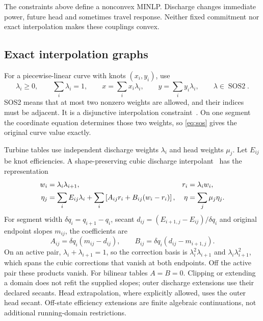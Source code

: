 \documentclass[10pt,a4paper]{article}
\newcommand{\SOS}{\operatorname{SOS2}}
\begin{document}
The constraints above define a nonconvex MINLP. Discharge changes immediate
power, future head and sometimes travel response. Neither fixed commitment
nor exact interpolation makes these couplings convex.

\subsection{Exact interpolation graphs}

For a piecewise-linear curve with knots $(x_i,y_i)$, use
\begin{equation}
\lambda_i\ge0,\qquad \sum_i\lambda_i=1,\qquad
x=\sum_i x_i\lambda_i,\qquad y=\sum_i y_i\lambda_i,\qquad
\lambda\in\SOS .
\label{eq:sos}
\end{equation}
SOS2 means that at most two nonzero weights are allowed, and their indices
must be adjacent. It is a disjunctive interpolation constraint~\cite{huch}.
On one segment the coordinate equation determines those two weights, so
\eqref{eq:sos} gives the original curve value exactly.

Turbine tables use independent discharge weights $\lambda_i$ and head
weights $\mu_j$. Let $E_{ij}$ be knot efficiencies. A shape-preserving
cubic discharge interpolant~\cite{fritsch} has the representation
\begin{align}
w_i&=\lambda_i\lambda_{i+1},&
r_i&=\lambda_iw_i,\notag\\
\eta_j&=\sum_i E_{ij}\lambda_i+
\sum_i\left[A_{ij}r_i+B_{ij}(w_i-r_i)\right],&
\eta&=\sum_j\mu_j\eta_j .
\label{eq:cubic}
\end{align}
For segment width $\delta q_i=q_{i+1}-q_i$, secant
$d_{ij}=(E_{i+1,j}-E_{ij})/\delta q_i$ and original endpoint slopes
$m_{ij}$, the coefficients are
\begin{equation}
A_{ij}=\delta q_i(m_{ij}-d_{ij}),\qquad
B_{ij}=\delta q_i(d_{ij}-m_{i+1,j}).
\label{eq:hermitecoefficients}
\end{equation}
On an active pair, $\lambda_i+\lambda_{i+1}=1$, so the correction
basis is $\lambda_i^2\lambda_{i+1}$ and
$\lambda_i\lambda_{i+1}^2$, which spans the cubic corrections that vanish
at both endpoints. Off the active pair these products vanish.
For bilinear tables $A=B=0$. Clipping or extending a domain does not refit
the supplied slopes; outer discharge extensions use their declared secants.
Head extrapolation, where explicitly allowed, uses the outer head secant.
Off-state efficiency extensions are finite algebraic continuations, not
additional running-domain restrictions.
\end{document}
